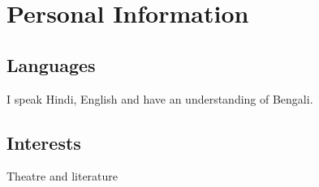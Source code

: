 \documentclass{article}
\begin{document}

\section{Personal Information}

\subsection{Languages}
I speak Hindi, English
and have an understanding of Bengali.
\subsection{Interests}
Theatre and literature
\end{document}
